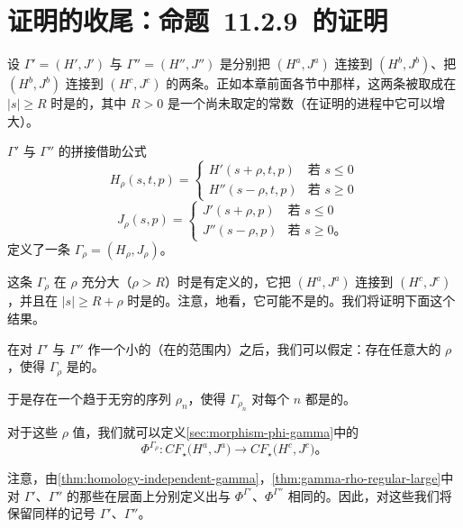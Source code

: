 
\section{\trFloerHomology\trInvariance{}证明的收尾：命题~11.2.9~的证明}
\label{sec:conclusion-invariance}

设 $\Gamma'=(H',J')$ 与 $\Gamma''=(H'',J'')$ 是分别把 $(H^{a},J^{a})$ 连接到
$(H^{b},J^{b})$、把 $(H^{b},J^{b})$ 连接到 $(H^{c},J^{c})$ 的两条\trRegular\trHomotopy。正如本章前面各节中那样，这两条\trHomotopy{}被取成在 $|s|\ge R$ 时是\trStationary{}的，其中 $R>0$ 是一个尚未取定的常数（在证明的进程中它可以增大）。

$\Gamma'$ 与 $\Gamma''$ 的拼接借助公式
\[
H_{\rho}(s,t,p)=
\left\{\begin{array}{ll}
H'(s+\rho,t,p) & \text{若 } s\le 0\\
H''(s-\rho,t,p) & \text{若 } s\ge 0
\end{array}\right.
\]
\[
J_{\rho}(s,p)=
\left\{\begin{array}{ll}
J'(s+\rho,p) & \text{若 } s\le 0\\
J''(s-\rho,p) & \text{若 } s\ge 0\text{。}
\end{array}\right.
\]
定义了一条\trHomotopy{} $\Gamma_{\rho}=(H_{\rho},J_{\rho})$。

这条\trHomotopy{} $\Gamma_{\rho}$ 在 $\rho$ 充分大（$\rho>R$）时是有定义的，它把
$(H^{a},J^{a})$ 连接到 $(H^{c},J^{c})$，并且在 $|s|\ge R+\rho$ 时是\trStationary{}的。注意，\trApriori{}地看，它可能不是\trRegular{}的。我们将证明下面这个结果。

\begin{lemma}\label{thm:gamma-rho-regular-large}
在对 $\Gamma'$ 与 $\Gamma''$ 作一个小的\trPerturbation{}（在\trRegular\trHomotopy{}的范围内）之后，我们可以假定：存在任意大的 $\rho$，使得 $\Gamma_{\rho}$ 是\trRegular{}的。
\end{lemma}

于是存在一个趋于无穷的序列 $\rho_{n}$，使得 $\Gamma_{\rho_{n}}$ 对每个 $n$ 都是\trRegular{}的。

对于这些 $\rho$ 值，我们就可以定义\cref{sec:morphism-phi-gamma}中\trComplex{}的\trMorphism
\[
\Phi^{\Gamma_{\rho}}\colon CF_{\star}\bigl(H^{a},J^{a}\bigr)
\longrightarrow CF_{\star}\bigl(H^{c},J^{c}\bigr)\text{。}
\]

注意，由\cref{thm:homology-independent-gamma}，\cref{thm:gamma-rho-regular-large}中对 $\Gamma'$、$\Gamma''$ 的那些\trPerturbation{}在\trHomology{}层面上分别定义出与 $\Phi^{\Gamma'}$、$\Phi^{\Gamma''}$ 相同的\trMorphism。因此，对这些\trHomotopy{}我们将保留同样的记号 $\Gamma'$、$\Gamma''$。

